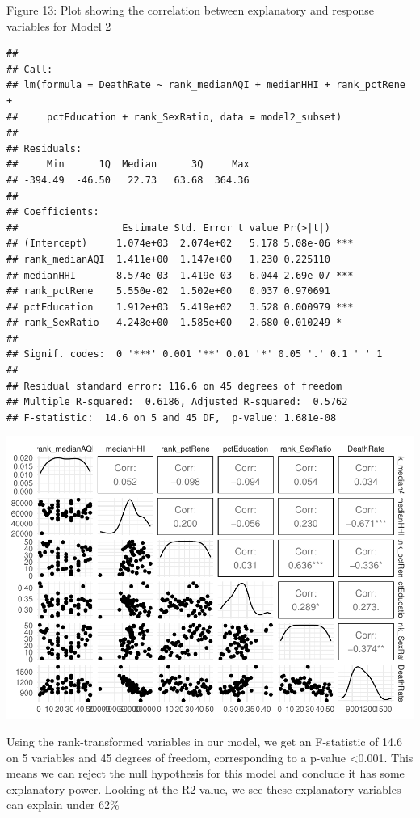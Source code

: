 \documentclass[
]{article}
\begin{document}
Figure 13: Plot showing the correlation between explanatory and response
variables for Model 2

\begin{verbatim}
## 
## Call:
## lm(formula = DeathRate ~ rank_medianAQI + medianHHI + rank_pctRene + 
##     pctEducation + rank_SexRatio, data = model2_subset)
## 
## Residuals:
##     Min      1Q  Median      3Q     Max 
## -394.49  -46.50   22.73   63.68  364.36 
## 
## Coefficients:
##                  Estimate Std. Error t value Pr(>|t|)    
## (Intercept)     1.074e+03  2.074e+02   5.178 5.08e-06 ***
## rank_medianAQI  1.411e+00  1.147e+00   1.230 0.225110    
## medianHHI      -8.574e-03  1.419e-03  -6.044 2.69e-07 ***
## rank_pctRene    5.550e-02  1.502e+00   0.037 0.970691    
## pctEducation    1.912e+03  5.419e+02   3.528 0.000979 ***
## rank_SexRatio  -4.248e+00  1.585e+00  -2.680 0.010249 *  
## ---
## Signif. codes:  0 '***' 0.001 '**' 0.01 '*' 0.05 '.' 0.1 ' ' 1
## 
## Residual standard error: 116.6 on 45 degrees of freedom
## Multiple R-squared:  0.6186, Adjusted R-squared:  0.5762 
## F-statistic:  14.6 on 5 and 45 DF,  p-value: 1.681e-08
\end{verbatim}

\begin{center}\includegraphics{EDA_Project_Mutha_Kry_Ghosh_VS_files/figure-latex/model2 results-1} \end{center}

Using the rank-transformed variables in our model, we get an F-statistic
of 14.6 on 5 variables and 45 degrees of freedom, corresponding to a
p-value \textless0.001. This means we can reject the null hypothesis for
this model and conclude it has some explanatory power. Looking at the R2
value, we see these explanatory variables can explain under 62\%
\end{document}
